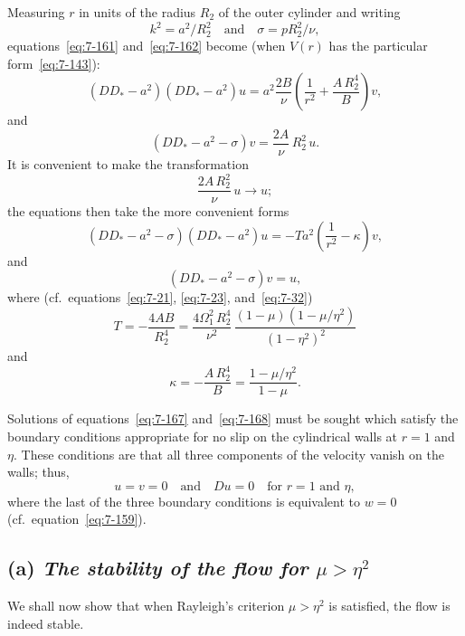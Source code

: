 Measuring $r$ in units of the radius $R_2$ of the outer cylinder and writing
\begin{equation}
\label{eq:7-163}
k^2 = a^2/R_2^2 \quad \text{and} \quad
\sigma = p R_2^2/\nu,
\end{equation}
equations~\eqref{eq:7-161} and~\eqref{eq:7-162} become (when $V(r)$ has the particular form~\eqref{eq:7-143}):
\begin{equation}
\label{eq:7-164}
(DD_*-a^2)(DD_*-a^2)u = a^2\frac{2B}{\nu}\!\left(\frac{1}{r^2}+\frac{A\,R_2^4}{B}\right)v,
\end{equation}
and
\begin{equation}
\label{eq:7-165}
(DD_*-a^2-\sigma)v = \frac{2A}{\nu}\,R_2^2\, u.
\end{equation}
It is convenient to make the transformation
\begin{equation}
\label{eq:7-166}
\frac{2A\,R_2^2}{\nu}\,u \to u;
\end{equation}
the equations then take the more convenient forms
\begin{equation}
\label{eq:7-167}
(DD_*-a^2-\sigma)(DD_*-a^2)u = -Ta^2\!\left(\frac{1}{r^2}-\kappa\right)v,
\end{equation}
and
\begin{equation}
\label{eq:7-168}
(DD_*-a^2-\sigma)v = u,
\end{equation}
where (cf.\ equations~\eqref{eq:7-21}, \eqref{eq:7-23}, and~\eqref{eq:7-32})
\begin{equation}
\label{eq:7-169}
T = -\frac{4AB}{R_2^4} = \frac{4\Omega_1^2\,R_2^4}{\nu^2}\,
\frac{(1-\mu)(1-\mu/\eta^2)}{(1-\eta^2)^2}
\end{equation}
and
\begin{equation}
\label{eq:7-170}
\kappa = -\frac{A\,R_2^4}{B} = \frac{1-\mu/\eta^2}{1-\mu}.
\end{equation}

Solutions of equations~\eqref{eq:7-167} and~\eqref{eq:7-168} must be sought which satisfy
the boundary conditions appropriate for no slip on the cylindrical walls
at $r = 1$ and $\eta$.  These conditions are that all three components of the
velocity vanish on the walls; thus,
\begin{equation}
\label{eq:7-171}
u = v = 0 \quad \text{and} \quad Du = 0
\quad \text{for } r = 1 \text{ and } \eta,
\end{equation}
where the last of the three boundary conditions is equivalent to $w = 0$
(cf.\ equation~\eqref{eq:7-159}).

\subsection*{(a) \emph{The stability of the flow for $\mu > \eta^2$}}
We shall now show that when Rayleigh's criterion $\mu > \eta^2$ is satisfied,
the flow is indeed stable.


